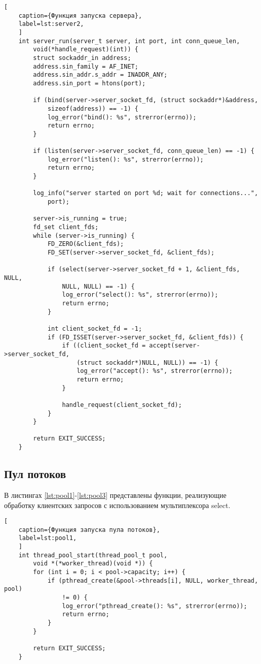 \begin{lstlisting}[
	caption={Функция запуска сервера},
	label=lst:server2,
	]
	int server_run(server_t server, int port, int conn_queue_len, 
		void(*handle_request)(int)) {
		struct sockaddr_in address;
		address.sin_family = AF_INET;
		address.sin_addr.s_addr = INADDR_ANY;
		address.sin_port = htons(port);
		
		if (bind(server->server_socket_fd, (struct sockaddr*)&address, 
			sizeof(address)) == -1) {
			log_error("bind(): %s", strerror(errno));
			return errno;
		}
		
		if (listen(server->server_socket_fd, conn_queue_len) == -1) {
			log_error("listen(): %s", strerror(errno));
			return errno;
		}
		
		log_info("server started on port %d; wait for connections...", 
			port);
		
		server->is_running = true;
		fd_set client_fds;
		while (server->is_running) {
			FD_ZERO(&client_fds);
			FD_SET(server->server_socket_fd, &client_fds);
			
			if (select(server->server_socket_fd + 1, &client_fds, NULL, 
				NULL, NULL) == -1) {
				log_error("select(): %s", strerror(errno));
				return errno;
			}
			
			int client_socket_fd = -1;
			if (FD_ISSET(server->server_socket_fd, &client_fds)) {
				if ((client_socket_fd = accept(server->server_socket_fd, 
					(struct sockaddr*)NULL, NULL)) == -1) {
					log_error("accept(): %s", strerror(errno));
					return errno;
				}
				
				handle_request(client_socket_fd);
			}
		}
		
		return EXIT_SUCCESS;
	}
\end{lstlisting}

\subsection{Пул потоков}

В листингах \ref{lst:pool1}-\ref{lst:pool3} представлены функции, реализующие обработку клиентских запросов с использованием мультиплексора select.

\begin{lstlisting}[
	caption={Функция запуска пула потоков},
	label=lst:pool1,
	]
	int thread_pool_start(thread_pool_t pool, 
		void *(*worker_thread)(void *)) {
		for (int i = 0; i < pool->capacity; i++) {
			if (pthread_create(&pool->threads[i], NULL, worker_thread, pool) 
				!= 0) {
				log_error("pthread_create(): %s", strerror(errno));
				return errno;
			}
		}
		
		return EXIT_SUCCESS;
	}
\end{lstlisting}

